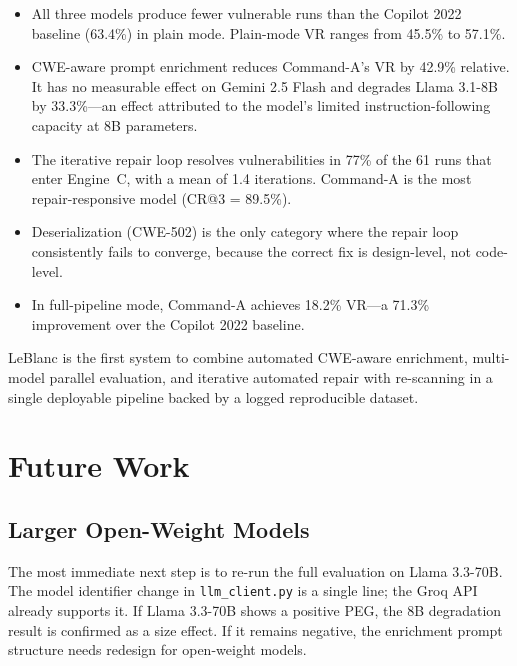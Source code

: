 \documentclass[12pt,a4paper]{report}
\begin{document}
\begin{itemize}
  \item All three models produce fewer vulnerable runs than the Copilot 2022
        baseline (63.4\%) in plain mode. Plain-mode VR ranges from 45.5\% to 57.1\%.

  \item CWE-aware prompt enrichment reduces Command-A's VR by 42.9\% relative.
        It has no measurable effect on Gemini 2.5 Flash and degrades Llama 3.1-8B
        by 33.3\%---an effect attributed to the model's limited instruction-following
        capacity at 8B parameters.

  \item The iterative repair loop resolves vulnerabilities in 77\% of the 61 runs
        that enter Engine~C, with a mean of 1.4 iterations. Command-A is the most
        repair-responsive model (CR@3 = 89.5\%).

  \item Deserialization (CWE-502) is the only category where the repair loop
        consistently fails to converge, because the correct fix is design-level,
        not code-level.

  \item In full-pipeline mode, Command-A achieves 18.2\% VR---a 71.3\% improvement
        over the Copilot 2022 baseline.
\end{itemize}

LeBlanc is the first system to combine automated CWE-aware enrichment, multi-model
parallel evaluation, and iterative automated repair with re-scanning in a single
deployable pipeline backed by a logged reproducible dataset.

\section{Future Work}
\label{sec:futurework}

\subsection{Larger Open-Weight Models}

The most immediate next step is to re-run the full evaluation on Llama 3.3-70B.
The model identifier change in \texttt{llm\_client.py} is a single line; the
Groq API already supports it. If Llama 3.3-70B shows a positive PEG, the 8B
degradation result is confirmed as a size effect. If it remains negative, the
enrichment prompt structure needs redesign for open-weight models.
\end{document}
